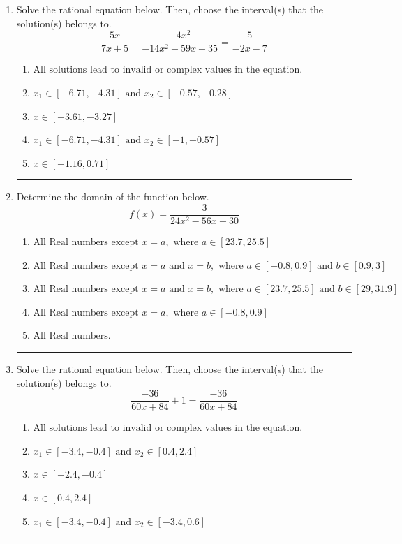 \documentclass[14pt]{extbook}
\newcommand{\litem}[1]{\item#1\hspace*{-1cm}\rule{\textwidth}{0.4pt}}
\begin{document}
\begin{enumerate}
\litem{
Solve the rational equation below. Then, choose the interval(s) that the solution(s) belongs to.\[ \frac{5x}{7x + 5} + \frac{-4x^{2}}{-14x^{2} -59 x -35} = \frac{5}{-2x -7} \]\begin{enumerate}[label=\Alph*.]
\item \( \text{All solutions lead to invalid or complex values in the equation.} \)
\item \( x_1 \in [-6.71, -4.31] \text{ and } x_2 \in [-0.57,-0.28] \)
\item \( x \in [-3.61,-3.27] \)
\item \( x_1 \in [-6.71, -4.31] \text{ and } x_2 \in [-1,-0.57] \)
\item \( x \in [-1.16,0.71] \)

\end{enumerate} }
\litem{
Determine the domain of the function below.\[ f(x) = \frac{3}{24x^{2} -56 x + 30} \]\begin{enumerate}[label=\Alph*.]
\item \( \text{All Real numbers except } x = a, \text{ where } a \in [23.7, 25.5] \)
\item \( \text{All Real numbers except } x = a \text{ and } x = b, \text{ where } a \in [-0.8, 0.9] \text{ and } b \in [0.9, 3] \)
\item \( \text{All Real numbers except } x = a \text{ and } x = b, \text{ where } a \in [23.7, 25.5] \text{ and } b \in [29, 31.9] \)
\item \( \text{All Real numbers except } x = a, \text{ where } a \in [-0.8, 0.9] \)
\item \( \text{All Real numbers.} \)

\end{enumerate} }
\litem{
Solve the rational equation below. Then, choose the interval(s) that the solution(s) belongs to.\[ \frac{-36}{60x + 84} + 1 = \frac{-36}{60x + 84} \]\begin{enumerate}[label=\Alph*.]
\item \( \text{All solutions lead to invalid or complex values in the equation.} \)
\item \( x_1 \in [-3.4, -0.4] \text{ and } x_2 \in [0.4,2.4] \)
\item \( x \in [-2.4,-0.4] \)
\item \( x \in [0.4,2.4] \)
\item \( x_1 \in [-3.4, -0.4] \text{ and } x_2 \in [-3.4,0.6] \)


\end{enumerate}}
\end{enumerate}
\end{document}
